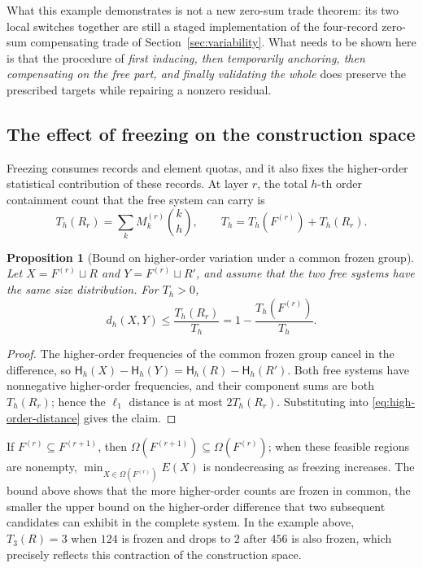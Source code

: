 \documentclass[11pt,a4paper]{article}
\numberwithin{equation}{section}
\newtheorem{proposition}{Proposition}[section]
\theoremstyle{definition}
\numberwithin{algorithm}{section}
\begin{document}
What this example demonstrates is not a new zero-sum trade theorem:
its two local switches together are still a staged implementation of the four-record zero-sum
compensating trade of Section~\ref{sec:variability}.
What needs to be shown here is that the procedure of \emph{first inducing, then temporarily
anchoring, then compensating on the free part, and finally validating the whole} does
preserve the prescribed targets while repairing a nonzero residual.

\subsection{The effect of freezing on the construction space}\label{subsec:directed-budget}

Freezing consumes records and element quotas, and it also fixes the higher-order statistical
contribution of these records.
At layer $r$, the total $h$-th order containment count that the free system can carry is
\begin{equation}
T_h(R_r)=\sum_kM_k^{(r)}\binom kh,\qquad
T_h=T_h(F^{(r)})+T_h(R_r).
\label{eq:residual-high-budget}
\end{equation}

\begin{proposition}[Bound on higher-order variation under a common frozen group]
\label{prop:frozen-distance}
Let $X=F^{(r)}\sqcup R$ and
$Y=F^{(r)}\sqcup R'$,
and assume that the two free systems have the same size distribution.
For $T_h>0$,
\begin{equation}
\boxed{\
d_h(X,Y)\le\frac{T_h(R_r)}{T_h}
=1-\frac{T_h(F^{(r)})}{T_h}.\ }
\label{eq:frozen-distance}
\end{equation}
\end{proposition}
\begin{proof}
The higher-order frequencies of the common frozen group cancel in the difference, so
$\mathsf H_h(X)-\mathsf H_h(Y)
=\mathsf H_h(R)-\mathsf H_h(R')$.
Both free systems have nonnegative higher-order frequencies, and their component sums are
both $T_h(R_r)$; hence the $\ell_1$ distance is at most $2T_h(R_r)$.
Substituting into \eqref{eq:high-order-distance} gives the claim.
\end{proof}

If $F^{(r)}\subseteq F^{(r+1)}$, then $\Omega(F^{(r+1)})\subseteq\Omega(F^{(r)})$;
when these feasible regions are nonempty,
$\min_{X\in\Omega(F^{(r)})}E(X)$ is nondecreasing as freezing increases.
The bound above shows that the more higher-order counts are frozen in common, the smaller
the upper bound on the higher-order difference that two subsequent candidates can exhibit in
the complete system.
In the example above, $T_3(R)=3$ when $124$ is frozen and drops to $2$ after $456$ is also
frozen, which precisely reflects this contraction of the construction space.
\end{document}
